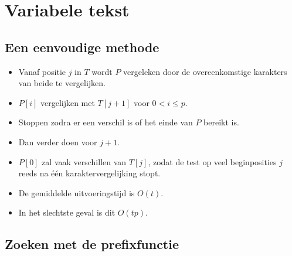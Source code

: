 \section{Variabele tekst}


\subsection{Een eenvoudige methode}
\begin{itemize}
    \item Vanaf positie $j$ in $T$ wordt $P$ vergeleken door de overeenkomstige karakters van beide te vergelijken.
    \item $P[i]$ vergelijken met $T[j + 1]$ voor $0 < i \leq p$.
    \item Stoppen zodra er een verschil is of het einde van $P$ bereikt is.
    \item Dan verder doen voor $j + 1$.
    \item $P[0]$ zal vaak verschillen van $T[j]$, zodat de test op veel beginposities $j$ reeds na één karaktervergelijking stopt.
    \item De gemiddelde uitvoeringstijd is $O(t)$.
    \item In het slechtste geval is dit $O(tp)$.
\end{itemize}


\subsection{Zoeken met de prefixfunctie}

